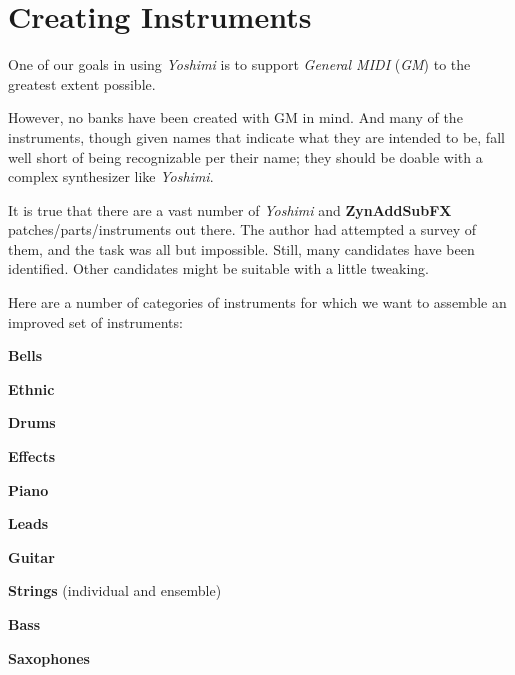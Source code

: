 %
%
%

\section{Creating Instruments}
\label{sec:cookbook_instruments}

   One of our goals in using \textsl{Yoshimi} is to support
   \textsl{General MIDI} (\textsl{GM})
   to the greatest extent possible.

   However, no banks have been created with GM in mind.  And many of the
   instruments, though given names that indicate what they are intended to
   be, fall well short of being recognizable per their name; they should be
   doable with a complex synthesizer like \textsl{Yoshimi}.
  
   It is true that there are a vast number of \textsl{Yoshimi} and
   \textbf{ZynAddSubFX} patches/parts/instruments out there.  The author
   had attempted a survey of them, and the task was all but impossible.
   Still, many candidates have been identified.  Other candidates might be
   suitable with a little tweaking.

   Here are a number of categories of instruments for which we want to
   assemble an improved set of instruments:

   \begin{enumber}
      \item \textbf{Bells}
      \item \textbf{Ethnic}
      \item \textbf{Drums}
      \item \textbf{Effects}
      \item \textbf{Piano}
      \item \textbf{Leads}
      \item \textbf{Guitar}
      \item \textbf{Strings} (individual and ensemble)
      \item \textbf{Bass}
      \item \textbf{Saxophones}
   \end{enumber}

